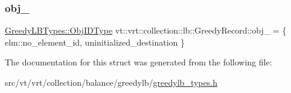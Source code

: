 \mbox{\label{structvt_1_1vrt_1_1collection_1_1lb_1_1_greedy_record_ab0e01d4431f547a017c9a4887bf5d207}} 
\subsubsection{\texorpdfstring{obj\+\_\+}{obj\_}}
{\footnotesize\ttfamily \hyperlink{structvt_1_1vrt_1_1collection_1_1lb_1_1_greedy_l_b_types_ae22670acd689e4ff83315fac2e4acb5e}{Greedy\+L\+B\+Types\+::\+Obj\+I\+D\+Type} vt\+::vrt\+::collection\+::lb\+::\+Greedy\+Record\+::obj\+\_\+ = \{ elm\+::no\+\_\+element\+\_\+id, uninitialized\+\_\+destination \}\hspace{0.3cm}{\ttfamily [private]}}



The documentation for this struct was generated from the following file\+:\begin{DoxyCompactItemize}
\item 
src/vt/vrt/collection/balance/greedylb/\hyperlink{greedylb__types_8h}{greedylb\+\_\+types.\+h}\end{DoxyCompactItemize}
